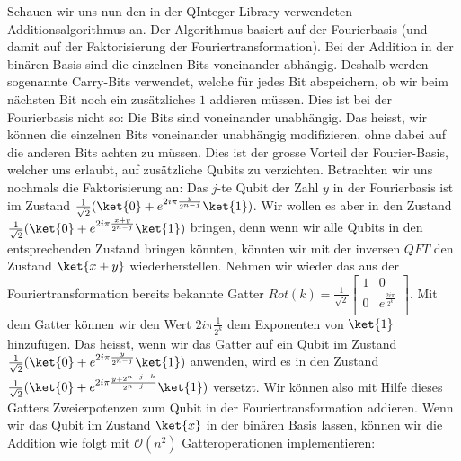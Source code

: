 Schauen wir uns nun den in der QInteger-Library verwendeten Additionsalgorithmus an. Der Algorithmus basiert auf der Fourierbasis (und damit auf der Faktorisierung der Fouriertransformation). Bei der Addition in der binären Basis sind die einzelnen Bits voneinander abhängig. Deshalb werden sogenannte Carry-Bits verwendet, welche für jedes Bit abspeichern, ob wir beim nächsten Bit noch ein zusätzliches $1$ addieren müssen. Dies ist bei der Fourierbasis nicht so: Die Bits sind voneinander unabhängig. Das heisst, wir können die einzelnen Bits voneinander unabhängig modifizieren, ohne dabei auf die anderen Bits achten zu müssen. Dies ist der grosse Vorteil der Fourier-Basis, welcher uns erlaubt, auf zusätzliche Qubits zu verzichten. Betrachten wir uns nochmals die Faktorisierung an: Das $j$-te Qubit der Zahl $y$ in der Fourierbasis ist im Zustand $\frac{1}{\sqrt{2}}(\ket{0} + e^{2i\pi\frac{y}{2^{n - j}}}\ket{1})$. Wir wollen es aber in den Zustand $\frac{1}{\sqrt{2}}(\ket{0} + e^{2i\pi\frac{x + y}{2^{n - j}}}\ket{1})$ bringen, denn wenn wir alle Qubits in den entsprechenden Zustand bringen könnten, könnten wir mit der inversen $QFT$ den Zustand $\ket{x + y}$ wiederherstellen. Nehmen wir wieder das aus der Fouriertransformation bereits bekannte Gatter $Rot(k) = \frac{1}{\sqrt{2}}\begin{bmatrix}
    1 & 0 \\
    0 & e^{\frac{2i\pi}{2^k}} \\
\end{bmatrix}$. Mit dem Gatter können wir den Wert $2i\pi\frac{1}{2^k}$ dem Exponenten von $\ket{1}$ hinzufügen. Das heisst, wenn wir das Gatter auf ein Qubit im Zustand $\frac{1}{\sqrt{2}}(\ket{0} + e^{2i\pi\frac{y}{2^{n - j}}}\ket{1})$ anwenden, wird es in den Zustand $\frac{1}{\sqrt{2}}(\ket{0} + e^{2i\pi\frac{y + 2^{n - j - k}}{2^{n - j}}}\ket{1})$ versetzt. Wir können also mit Hilfe dieses Gatters Zweierpotenzen zum Qubit in der Fouriertransformation addieren. Wenn wir das Qubit im Zustand $\ket{x}$ in der binären Basis lassen, können wir die Addition wie folgt mit $\mathcal O(n^2)$ Gatteroperationen implementieren:

